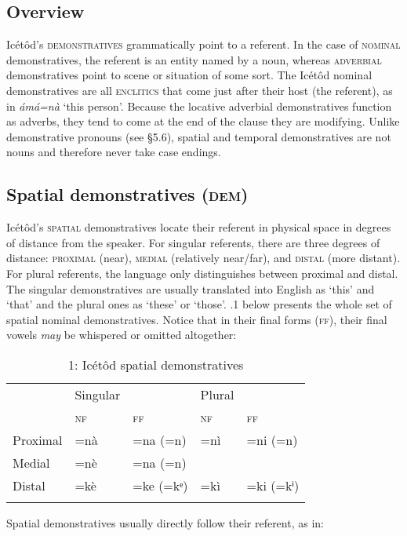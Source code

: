 \subsection{Overview}


Icétôd’s \textsc{demonstratives} grammatically point to a referent. In the case of \textsc{nominal} demonstratives, the referent is an entity named by a noun, whereas \textsc{adverbial} demonstratives point to scene or situation of some sort. The Icétôd nominal demonstratives are all \textsc{enclitics} that come just after their host (the referent), as in \textit{ámá=nà }‘this person’. Because the locative adverbial demonstratives function as adverbs, they tend to come at the end of the clause they are modifying. Unlike demonstrative pronouns (see §5.6), spatial and temporal demonstratives are not nouns and therefore never take case endings.




\subsection{Spatial demonstratives (\textsc{dem})}


Icétôd’s \textsc{spatial }demonstratives locate their referent in physical space in degrees of distance from the speaker. For singular referents, there are three degrees of distance: \textsc{proximal} (near), \textsc{medial} (relatively near/far), and \textsc{distal} (more distant). For plural referents, the language only distinguishes between proximal and distal. The singular demonstratives are usually translated into English as ‘this’ and ‘that’ and the plural ones as ‘these’ or ‘those’. .1 below presents the whole set of spatial nominal demonstratives. Notice that in their final forms (\textsc{ff}), their final vowels \textit{may} be whispered or omitted altogether:


\begin{table}
\caption{1: Icétôd spatial demonstratives}
\label{tab:6}


\begin{tabularx}{\textwidth}{XXXXX} & Singular &  & Plural & \\
\lsptoprule
& \textsc{nf} & \textsc{ff} & \textsc{nf} & \textsc{ff}\\
Proximal & =nà & =na (=n) & =nì & =ni (=n)\\
Medial & =nè & =na (=n) &  & \\
Distal & =kè & =ke (=kᵉ) & =kì & =ki (=kⁱ)\\
\lspbottomrule
\end{tabularx}
\end{table}
Spatial demonstratives usually directly follow their referent, as in:




